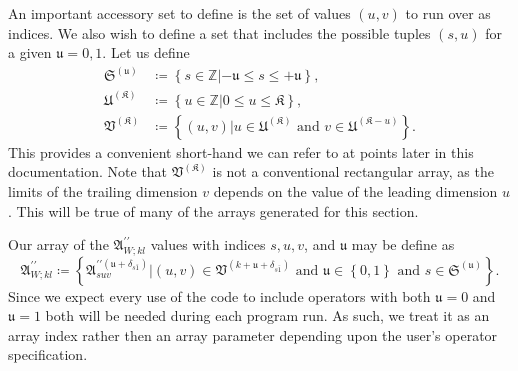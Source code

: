 An important accessory set to define is the set of values $\left(u,v\right)$ to
run over as indices. We also wish to define a set that includes the possible
tuples $\left(s,u\right)$ for a given $\mathfrak{u} = 0, 1$. Let us define
\begin{align}
\bm{\mathfrak{S}}^{\left(\mathfrak{u}\right)}
    &\coloneqq
        \left\{
            s \in \mathbb{Z}
                |
            -\mathfrak{u} \le s \le +\mathfrak{u}
        \right\}
,\\
\bm{\mathfrak{U}}^{\left(\mathfrak{K}\right)}
    &\coloneqq
        \left\{ u \in \mathbb{Z} | 0 \le u \le \mathfrak{K} \right\}
,\\
\bm{\mathfrak{V}}^{\left(\mathfrak{K}\right)}
    &\coloneqq
        \left\{
            \left(u,v\right)
                |
            u \in \bm{\mathfrak{U}}^{\left(\mathfrak{K}\right)}
                    \text{ and }
            v \in \bm{\mathfrak{U}}^{\left(\mathfrak{K}-u\right)}
        \right\}
.
\end{align}
This provides a convenient short-hand we can refer to at points later in this
documentation. Note that $\bm{\mathfrak{V}}^{\left(\mathfrak{K}\right)}$ is not
a conventional rectangular array, as the limits of the trailing dimension $v$
depends on the value of the leading dimension $u$. This will be true of many of
the arrays generated for this section.

Our array of the $\bm{\mathfrak{A}} _{ W;kl } ^{ \prime\prime } $ values with
indices $s, u, v$, and $\mathfrak{u}$ may be define as
\begin{equation}
\bm{\mathfrak{A}}_{W;kl}^{\prime\prime}
    \coloneqq
        \left\{
            \mathfrak{A}
            _{suv}
            ^{\prime\prime\left(\mathfrak{u}+\delta_{s\bar{1}}\right)}
                |
            \left(u,v\right)
                \in
            \bm{\mathfrak{V}}^{\left(k+\mathfrak{u}+\delta_{s\bar{1}}\right)}
                \text{ and }
            \mathfrak{u} \in \left\{ 0,1 \right\}
                \text{ and }
            s \in \mathfrak{S}^{\left(\mathfrak{u}\right)}
        \right\}
.
\end{equation}
Since we expect every use of the code to include operators with both $
\mathfrak{u} = 0 $ and $ \mathfrak{u} = 1 $ both will be needed during each
program run. As such, we treat it as an array index rather then an array
parameter depending upon the user's operator specification.

